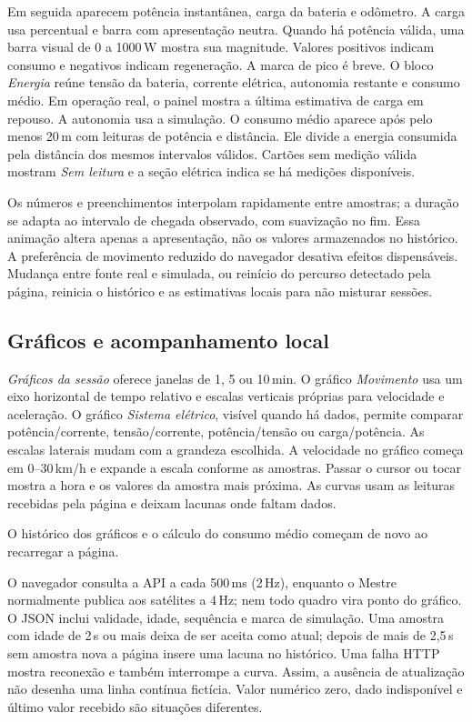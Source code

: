 Em seguida aparecem potência instantânea, carga da bateria e odômetro. A carga usa percentual e barra com apresentação neutra. Quando há potência válida, uma barra visual de 0 a 1000\,W mostra sua magnitude. Valores positivos indicam consumo e negativos indicam regeneração. A marca de pico é breve. O bloco \emph{Energia} reúne tensão da bateria, corrente elétrica, autonomia restante e consumo médio. Em operação real, o painel mostra a última estimativa de carga em repouso. A autonomia usa a simulação. O consumo médio aparece após pelo menos 20\,m com leituras de potência e distância. Ele divide a energia consumida pela distância dos mesmos intervalos válidos. Cartões sem medição válida mostram \emph{Sem leitura} e a seção elétrica indica se há medições disponíveis.

Os números e preenchimentos interpolam rapidamente entre amostras; a duração se adapta ao intervalo de chegada observado, com suavização no fim. Essa animação altera apenas a apresentação, não os valores armazenados no histórico. A preferência de movimento reduzido do navegador desativa efeitos dispensáveis. Mudança entre fonte real e simulada, ou reinício do percurso detectado pela página, reinicia o histórico e as estimativas locais para não misturar sessões.

\subsection{Gráficos e acompanhamento local}
\emph{Gráficos da sessão} oferece janelas de 1, 5 ou 10\,min. O gráfico \emph{Movimento} usa um eixo horizontal de tempo relativo e escalas verticais próprias para velocidade e aceleração. O gráfico \emph{Sistema elétrico}, visível quando há dados, permite comparar potência/corrente, tensão/corrente, potência/tensão ou carga/potência. As escalas laterais mudam com a grandeza escolhida. A velocidade no gráfico começa em 0--30\,km/h e expande a escala conforme as amostras. Passar o cursor ou tocar mostra a hora e os valores da amostra mais próxima. As curvas usam as leituras recebidas pela página e deixam lacunas onde faltam dados.

O histórico dos gráficos e o cálculo do consumo médio começam de novo ao recarregar a página.

O navegador consulta a API a cada 500\,ms (2\,Hz), enquanto o Mestre normalmente publica aos satélites a 4\,Hz; nem todo quadro vira ponto do gráfico. O JSON inclui validade, idade, sequência e marca de simulação. Uma amostra com idade de 2\,s ou mais deixa de ser aceita como atual; depois de mais de 2,5\,s sem amostra nova a página insere uma lacuna no histórico. Uma falha HTTP mostra reconexão e também interrompe a curva. Assim, a ausência de atualização não desenha uma linha contínua fictícia. Valor numérico zero, dado indisponível e último valor recebido são situações diferentes.

